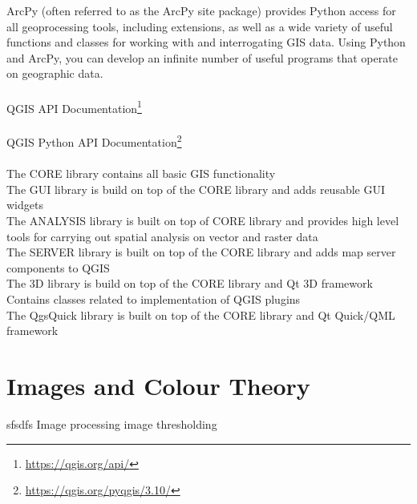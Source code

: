 ArcPy (often referred to as the ArcPy site package) provides Python access for all geoprocessing tools, including extensions, as well as a wide variety of useful functions and classes for working with and interrogating GIS data. Using Python and ArcPy, you can develop an infinite number of useful programs that operate on geographic data.
\\\\
QGIS API Documentation\footnote{\url{https://qgis.org/api/}}
\\\\
QGIS Python API Documentation\footnote{\url{https://qgis.org/pyqgis/3.10/}}
\\\\
The CORE library contains all basic GIS functionality\\
The GUI library is build on top of the CORE library and adds reusable GUI widgets\\
The ANALYSIS library is built on top of CORE library and provides high level tools for carrying out spatial analysis on vector and raster data\\
The SERVER library is built on top of the CORE library and adds map server components to QGIS\\
The 3D library is build on top of the CORE library and Qt 3D framework\\
Contains classes related to implementation of QGIS plugins\\
The QgsQuick library is built on top of the CORE library and Qt Quick/QML framework
\section{Images and Colour Theory}
\label{sec:col}
sfsdfs \cite{imgp} Image processing
image thresholding \cite{shap} 